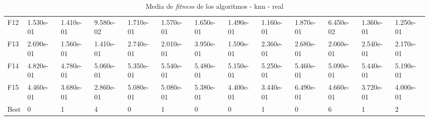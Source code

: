 \begin{table}
\begin{adjustbox}{width=\linewidth}
\begin{tabular}{lllllllllllll}
            F12  & 1.530e-01 & 1.410e-01 & 9.580e-02 & 1.710e-01 & 1.570e-01 & 1.650e-01 & 1.490e-01 & 1.160e-01 & 1.870e-01 & 6.450e-02 & 1.360e-01 & 1.250e-01 \\
            F13  & 2.690e-01 & 1.560e-01 & 1.410e-01 & 2.740e-01 & 2.010e-01 & 3.950e-01 & 1.590e-01 & 2.360e-01 & 2.680e-01 & 2.060e-01 & 2.540e-01 & 2.170e-01 \\
            F14  & 4.820e-01 & 4.780e-01 & 5.060e-01 & 5.350e-01 & 5.540e-01 & 5.480e-01 & 5.150e-01 & 5.250e-01 & 5.460e-01 & 5.090e-01 & 5.440e-01 & 5.190e-01 \\
            F15  & 4.460e-01 & 3.680e-01 & 2.860e-01 & 5.080e-01 & 5.080e-01 & 5.380e-01 & 4.400e-01 & 3.440e-01 & 6.490e-01 & 4.660e-01 & 3.720e-01 & 4.000e-01 \\
            Best & 0         & 1         & 4         & 0         & 1         & 0         & 0         & 1         & 0         & 6         & 1         & 2         \\
            \bottomrule
        \end{tabular}
    \end{adjustbox}
    \caption{Media de \textit{fitness} de los algoritmos - knn - real}
    \label{tab:mean_fitness_real_knn}
\end{table}

